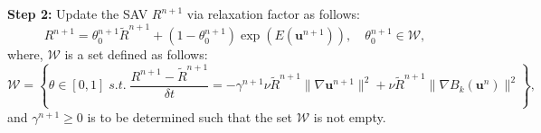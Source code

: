 \documentclass[final,review,onefignum,onetabnum]{siamart190516}
\theoremstyle{plain}
\begin{document}
\textbf{Step 2:} Update the SAV $R^{n+1}$ via relaxation factor as follows: 
\begin{equation}
 \label{eq:NS-R-ESAV2-new-BDFk-5}
	R^{n+1} = \theta_{0}^{n+1} \tilde{R}^{n+1} + (1-\theta_{0}^{n+1})\exp\left(E(\mathbf{u}^{n+1})\right), \quad \theta_{0}^{n+1} \in \mathcal{W},
\end{equation}
where, $\mathcal{W}$ is a set defined as follows: 
\begin{equation}
 \label{eq:NS-R-ESAV2-new-BDFk-6}
	\mathcal{W}=\left\lbrace \theta\in [0,1] \; s.t. \;   \frac{R^{n+1}-\tilde{R}^{n+1}}{\delta t} = -\gamma^{n+1} \nu \tilde{R}^{n+1} \|\nabla \mathbf{u}^{n+1}\|^{2} + \nu \tilde{R}^{n+1}\|\nabla B_{k}\left(\mathbf{u}^{n}\right)\|^{2}\right\rbrace,
\end{equation}
and  $\gamma^{n+1} \geq 0$ is to be determined such that  the set $\mathcal{W}$ is not empty. 
\end{document}
